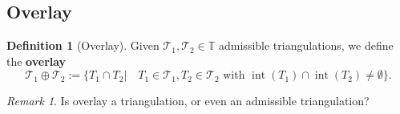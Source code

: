 \documentclass[a4paper,12pt,oneside,fleqn]{book}
\theoremstyle{definition}
\newtheorem{definition}{Definition}[section]
\theoremstyle{remark}
\newtheorem*{remark}{Remark}
\DeclareMathOperator*{\interior}{int}
\begin{document}
\subsection{Overlay}
\begin{definition}[Overlay]
  Given $\mathcal{T}_1, \mathcal{T}_2 \in \mathbb{T}$ admissible triangulations, we define the \textbf{overlay}
  \begin{equation}
  	\mathcal{T}_1 \oplus \mathcal{T}_2 := \{ T_1 \cap T_2 | \quad T_1 \in \mathcal{T}_1, T_2 \in \mathcal{T}_2 \text{ with } \interior(T_1) \cap \interior(T_2) \neq \emptyset \}.  
  \end{equation}
\end{definition}
\begin{remark}
Is overlay a triangulation, or even an admissible triangulation?	
\end{remark}
\end{document}
